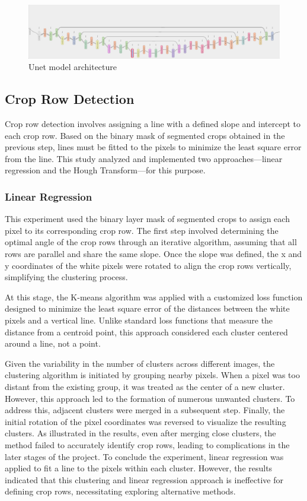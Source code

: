 \documentclass[conference]{IEEEtran}
\begin{document}
\begin{figure}[htbp]
\includegraphics[width=\linewidth]{UNET.png}
\caption{Unet model architecture}
\label{fig3}
\end{figure}

\subsection{Crop Row Detection}
Crop row detection involves assigning a line with a defined slope and intercept to each crop row. Based on the binary mask of segmented crops obtained in the previous step, lines must be fitted to the pixels to minimize the least square error from the line. This study analyzed and implemented two approaches—linear regression and the Hough Transform—for this purpose.

\subsubsection{Linear Regression}
This experiment used the binary layer mask of segmented crops to assign each pixel to its corresponding crop row. The first step involved determining the optimal angle of the crop rows through an iterative algorithm, assuming that all rows are parallel and share the same slope. Once the slope was defined, the x and y coordinates of the white pixels were rotated to align the crop rows vertically, simplifying the clustering process.

At this stage, the K-means algorithm was applied with a customized loss function designed to minimize the least square error of the distances between the white pixels and a vertical line. Unlike standard loss functions that measure the distance from a centroid point, this approach considered each cluster centered around a line, not a point.

Given the variability in the number of clusters across different images, the clustering algorithm is initiated by grouping nearby pixels. When a pixel was too distant from the existing group, it was treated as the center of a new cluster. However, this approach led to the formation of numerous unwanted clusters. To address this, adjacent clusters were merged in a subsequent step. Finally, the initial rotation of the pixel coordinates was reversed to visualize the resulting clusters. As illustrated in the results, even after merging close clusters, the method failed to accurately identify crop rows, leading to complications in the later stages of the project. To conclude the experiment, linear regression was applied to fit a line to the pixels within each cluster. However, the results indicated that this clustering and linear regression approach is ineffective for defining crop rows, necessitating exploring alternative methods.
\end{document}
